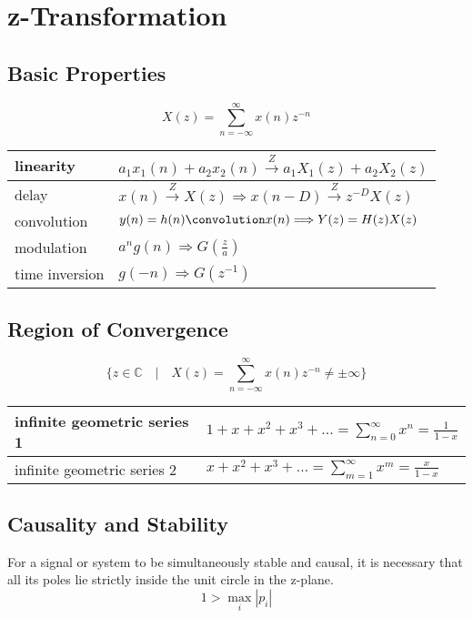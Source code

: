 \section{z-Transformation}

\subsection{Basic Properties}

\[
	X(z) = \sum\limits_{n=-\infty}^\infty x(n)z^{-n}
\]

\begin{tabularx}{0.6\textwidth}{|l|X|}
	\hline
	linearity & $a_1x_1(n) + a_2x_2(n) \overset{Z}{\longrightarrow} a_1X_1(z) + a_2X_2(z)$
	\\ \hline
	delay	& $x(n) \overset{Z}{\longrightarrow} X(z) \Longrightarrow x(n-D) \overset{Z}{\longrightarrow} z^{-D}X(z)$
	\\ \hline
	convolution & $y(n) = h(n) \convolution x(n) \Longrightarrow Y(z) = H(z)X(z)$
	\\ \hline
	modulation & $a^n g(n) \Longrightarrow G(\frac{z}{a})$
	\\ \hline
	time inversion & $g(-n) \Longrightarrow G(z^{-1})$
	\\ \hline
\end{tabularx}


\subsection{Region of Convergence}

\[
	\{ z \in \mathbb{C} \quad | \quad X(z) = \sum\limits_{n=-\infty}^{\infty} x(n)z^{-n} \neq \pm \infty \}
\]

\begin{tabularx}{0.6\textwidth}{|l|X|}
	\hline
	infinite geometric series 1 & $1 + x + x^2 + x^3 + \ldots = \sum\limits_{n=0}^{\infty} x^n = \frac{1}{1-x}$
	\\ \hline
	infinite geometric series 2 & $x + x^2 + x^3 + \ldots = \sum\limits_{m=1}^{\infty} x^m = \frac{x}{1-x}$
	\\ \hline
\end{tabularx}


\subsection{Causality and Stability}

For a signal or system to be simultaneously stable and causal, it is necessary that all its poles lie strictly inside the unit circle in the z-plane. 
\[ 1 > \max\limits_{i}|p_i| \]

